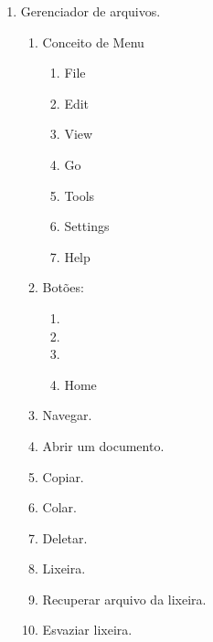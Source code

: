 \begin{enumerate}
	\item Gerenciador de arquivos.
	\begin{enumerate}
		\item Conceito de Menu
		\begin{enumerate}
			\item File
			\item Edit
			\item View
			\item Go
			\item Tools
			\item Settings
			\item Help
		\end{enumerate}
	\item Botões:
	\begin{enumerate}
		\item \LARGE \faArrowLeft
		\item \LARGE \faArrowRight
		\item \LARGE \faArrowUp
		\item \LARGE Home
	\end{enumerate}
		\item Navegar.
		\item Abrir um documento.
		\item Copiar.
		\item Colar.
		\item Deletar.
		\item Lixeira.
		\item Recuperar arquivo da lixeira.
		\item Esvaziar lixeira.
	\end{enumerate}
\end{enumerate}
